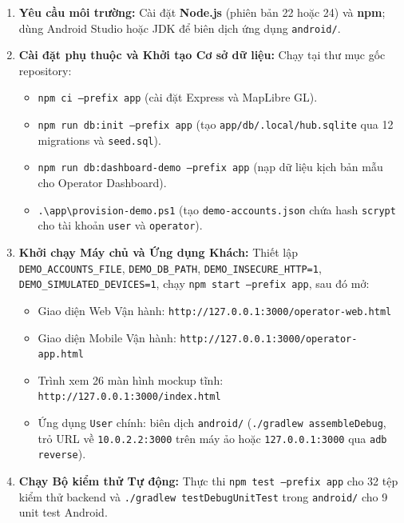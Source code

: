 \begin{enumerate}[leftmargin=*,nosep]
    \item \textbf{Yêu cầu môi trường:} Cài đặt \textbf{Node.js} (phiên bản 22 hoặc 24) và \textbf{npm}; dùng Android Studio hoặc JDK để biên dịch ứng dụng \texttt{android/}.
    \item \textbf{Cài đặt phụ thuộc và Khởi tạo Cơ sở dữ liệu:} Chạy tại thư mục gốc repository:
    \begin{itemize}[leftmargin=*,nosep]
        \item \texttt{npm ci --prefix app} (cài đặt Express và MapLibre GL).
        \item \texttt{npm run db:init --prefix app} (tạo \texttt{app/db/.local/hub.sqlite} qua 12 migrations và \texttt{seed.sql}).
        \item \texttt{npm run db:dashboard-demo --prefix app} (nạp dữ liệu kịch bản mẫu cho Operator Dashboard).
        \item \texttt{.\textbackslash app\textbackslash provision-demo.ps1} (tạo \texttt{demo-accounts.json} chứa hash \texttt{scrypt} cho tài khoản \texttt{user} và \texttt{operator}).
    \end{itemize}
    \item \textbf{Khởi chạy Máy chủ và Ứng dụng Khách:} Thiết lập \texttt{DEMO\_ACCOUNTS\_FILE}, \texttt{DEMO\_DB\_PATH}, \texttt{DEMO\_INSECURE\_HTTP=1}, \texttt{DEMO\_SIMULATED\_DEVICES=1}, chạy \texttt{npm start --prefix app}, sau đó mở:
    \begin{itemize}[leftmargin=*,nosep]
        \item Giao diện Web Vận hành: \texttt{http://127.0.0.1:3000/operator-web.html}
        \item Giao diện Mobile Vận hành: \texttt{http://127.0.0.1:3000/operator-app.html}
        \item Trình xem 26 màn hình mockup tĩnh: \texttt{http://127.0.0.1:3000/index.html}
        \item Ứng dụng \texttt{User} chính: biên dịch \texttt{android/} (\texttt{./gradlew assembleDebug}, trỏ URL về \texttt{10.0.2.2:3000} trên máy ảo hoặc \texttt{127.0.0.1:3000} qua \texttt{adb reverse}).
    \end{itemize}
    \item \textbf{Chạy Bộ kiểm thử Tự động:} Thực thi \texttt{npm test --prefix app} cho 32 tệp kiểm thử backend và \texttt{./gradlew testDebugUnitTest} trong \texttt{android/} cho 9 unit test Android.
\end{enumerate}
